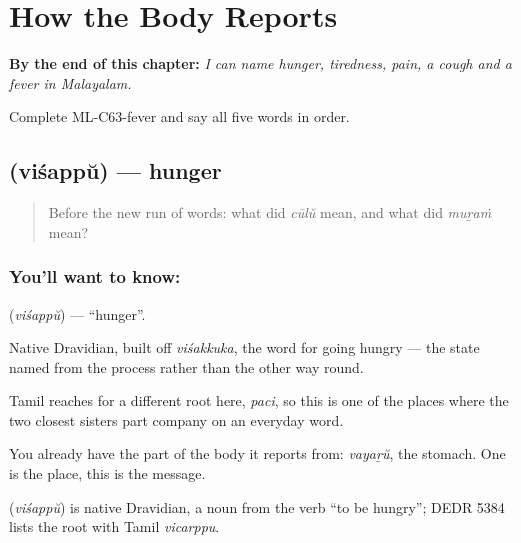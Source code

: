 
\chapter{How the Body Reports}
\label{ch:ml-how-the-body-reports}

\begin{chapteropening}
\textbf{By the end of this chapter:} \emph{I can name hunger, tiredness, pain, a cough and a fever in Malayalam.}

Complete ML-C63-fever and say all five words in order.
\end{chapteropening}

\section[\texorpdfstring{\ml{വിശപ്പ്} (viśappŭ)}{വിശപ്പ് (viśappŭ)}]{ (viśappŭ) — hunger}

\label{lesson:ML-C63-hunger}



\begin{quote}
Before the new run of words: what did \emph{cūlŭ} mean, and what did \emph{muṟaṁ} mean?
\end{quote}

\subsection*{You'll want to know: }
\textbf{} (\emph{viśappŭ}) — \textquotedblleft{}hunger\textquotedblright{}.

Native Dravidian, built off \emph{viśakkuka}, the word for going hungry — the state named from the process rather than the other way round.

Tamil reaches for a different root here, \emph{paci}, so this is one of the places where the two closest sisters part company on an everyday word.

You already have the part of the body it reports from: \emph{vayaṟŭ}, the stomach. One is the place, this is the message.

\begin{cousinweb}
\textbf{} (\emph{viśappŭ}) is native Dravidian, a noun from the verb \textquotedblleft{}to be hungry\textquotedblright{}; DEDR 5384 lists the root with Tamil \emph{vicarppu}.
\end{cousinweb}

